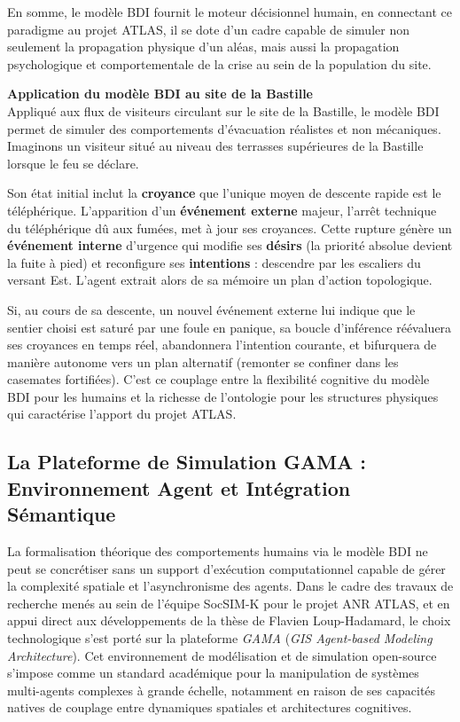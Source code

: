 \documentclass{article}
\begin{document}
En somme, le modèle BDI fournit le moteur décisionnel humain, en connectant ce paradigme au projet ATLAS, il se dote d'un cadre capable de simuler non seulement la propagation physique d'un aléas, mais aussi la propagation psychologique et comportementale de la crise au sein de la population du site.
\begin{filrouge}
\textbf{Application du modèle BDI au site de la Bastille} \\
Appliqué aux flux de visiteurs circulant sur le site de la Bastille, le modèle BDI permet de simuler des comportements d'évacuation réalistes et non mécaniques. Imaginons un visiteur situé au niveau des terrasses supérieures de la Bastille lorsque le feu se déclare. 

Son état initial inclut la \textbf{croyance} que l'unique moyen de descente rapide est le téléphérique. L'apparition d'un \textbf{événement externe} majeur, l'arrêt technique du téléphérique dû aux fumées, met à jour ses croyances. Cette rupture génère un \textbf{événement interne} d'urgence qui modifie ses \textbf{désirs} (la priorité absolue devient la fuite à pied) et reconfigure ses \textbf{intentions} : descendre par les escaliers du versant Est. L'agent extrait alors de sa mémoire un plan d'action topologique. 

Si, au cours de sa descente, un nouvel événement externe lui indique que le sentier choisi est saturé par une foule en panique, sa boucle d'inférence réévaluera ses croyances en temps réel, abandonnera l'intention courante, et bifurquera de manière autonome vers un plan alternatif (remonter se confiner dans les casemates fortifiées). C'est ce couplage entre la flexibilité cognitive du modèle BDI pour les humains et la richesse de l'ontologie pour les structures physiques qui caractérise l'apport du projet ATLAS.
\end{filrouge}

\subsection{La Plateforme de Simulation GAMA : Environnement Agent et Intégration Sémantique}
\label{subsec:plateforme_gama}

La formalisation théorique des comportements humains via le modèle BDI ne peut se concrétiser sans un support d'exécution computationnel capable de gérer la complexité spatiale et l'asynchronisme des agents. Dans le cadre des travaux de recherche menés au sein de l'équipe SocSIM-K pour le projet ANR ATLAS, et en appui direct aux développements de la thèse de Flavien Loup-Hadamard, le choix technologique s'est porté sur la plateforme \textit{GAMA} (\textit{GIS Agent-based Modeling Architecture}). Cet environnement de modélisation et de simulation open-source s'impose comme un standard académique pour la manipulation de systèmes multi-agents complexes à grande échelle, notamment en raison de ses capacités natives de couplage entre dynamiques spatiales et architectures cognitives.
\end{document}
